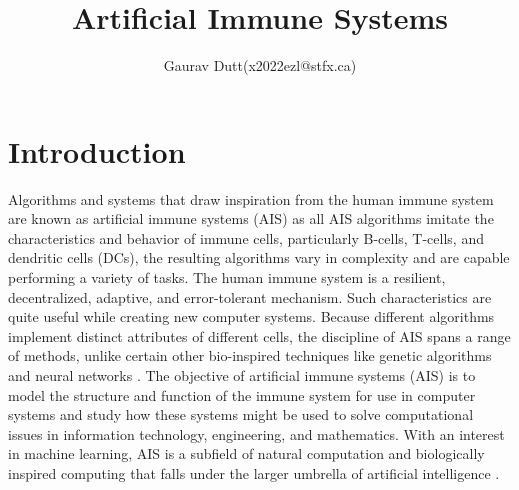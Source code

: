 \documentclass{article}
\title {Artificial Immune Systems}
\author{Gaurav Dutt(x2022ezl@stfx.ca)}
\begin{document}
\maketitle
\section{Introduction}
Algorithms and systems that draw inspiration from the human immune system are known as artificial immune systems (AIS) as all AIS algorithms imitate the characteristics and behavior of immune cells, particularly B-cells, T-cells, and dendritic cells (DCs), the resulting algorithms vary in complexity and are capable performing a variety of tasks. The human immune system is a resilient, decentralized, adaptive, and error-tolerant mechanism. Such characteristics are quite useful while creating new computer systems. Because different algorithms implement distinct attributes of different cells, the discipline of AIS spans a range of methods, unlike certain other bio-inspired techniques like genetic algorithms and neural networks \cite{greensmith2005artificial}.
The objective of artificial immune systems (AIS) is to model the structure and function of the immune system for use in computer systems and study how these systems might be used to solve computational issues in information technology, engineering, and mathematics. With an interest in machine learning, AIS is a subfield of natural computation and biologically inspired computing that falls under the larger umbrella of artificial intelligence \cite{enwiki:1240537176}.
\end{document}
